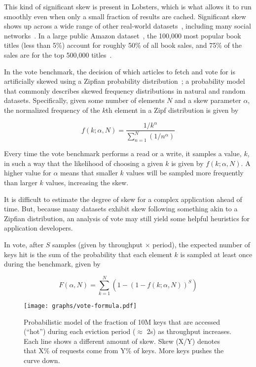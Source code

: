 This kind of significant skew is present in Lobsters, which is what allows it to
run smoothly even when only a small fraction of results are cached. Significant
skew shows up across a wide range of other real-world
datasets~\cite{power1,power2,network-skew,large-skew-analysis}, including many
social networks~\cite{network-skew2, community-skew}. In a large public Amazon
dataset~\cite{amazon-skew}, the 100,000 most popular book titles (less than 5\%)
account for roughly 50\% of all book sales, and 75\% of the sales are for the
top 500,000 titles~\cite{zhang2020permutation}.

In the vote benchmark, the decision of which articles to fetch and vote for is
artificially skewed using a Zipfian probability distribution~\cite{zipf}; a
probability model that commonly describes skewed frequency distributions in
natural and random datasets. Specifically, given some number of elements $N$ and
a skew parameter $\alpha$, the normalized frequency of the $k$th element in a
Zipf distribution is given by

\begin{displaymath}
  f\left(k;\alpha,N\right)={\frac {1/k^{\alpha}}{\sum \limits _{n=1}^{N}(1/n^{\alpha})}}
\end{displaymath}

Every time the vote benchmark performs a read or a write, it samples a value,
$k$, in such a way that the likelihood of choosing a given $k$ is given by
$f\left(k;\alpha,N\right)$. A higher value for $\alpha$ means that smaller $k$
values will be sampled more frequently than larger $k$ values, increasing the
skew.

It is difficult to estimate the degree of skew for a complex application ahead
of time. But, because many datasets exhibit skew following something akin to a
Zipfian distribution, an analysis of vote may still yield some helpful
heuristics for application developers.

In vote, after $S$ samples (given by throughput $\times$ period), the expected
number of keys hit is the sum of the probability that each element $k$ is
sampled at least once during the benchmark, given by

\begin{displaymath}
  F(\alpha,N)={\sum \limits _{k=1}^{N} \left(1 - \left(1 - f(k; \alpha, N)\right)^{S}\right)}
\end{displaymath}

\begin{figure}[h]
  \centering
  \texttt{[image: graphs/vote-formula.pdf]}
  \caption{Probabilistic model of the fraction of 10M keys that are accessed
  (``hot'') during each eviction period ($\approx$ 2s) as throughput increases.
  Each line shows a different amount of skew. Skew (X/Y) denotes that X\% of
  requests come from Y\% of keys. More keys pushes the curve down.}
  \label{f:vote-formula}
\end{figure}

